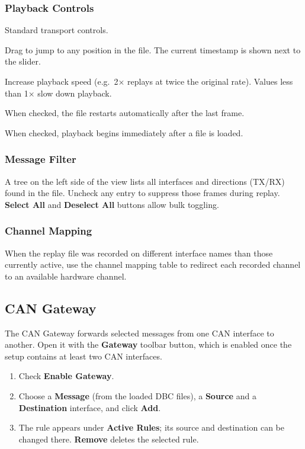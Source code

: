 \documentclass[a4paper,11pt]{article}
\newcommand{\ui}[1]{\textbf{#1}}
\begin{document}
\subsubsection{Playback Controls}

\begin{description}[leftmargin=2em, style=nextline]
  \item[Play / Pause / Stop] Standard transport controls.
  \item[Seek slider] Drag to jump to any position in the file. The current
        timestamp is shown next to the slider.
  \item[Speed multiplier] Increase playback speed (e.g.\ 2× replays at twice
        the original rate). Values less than 1× slow down playback.
  \item[Loop] When checked, the file restarts automatically after the last frame.
  \item[Auto-play] When checked, playback begins immediately after a file is loaded.
\end{description}

\subsubsection{Message Filter}

A tree on the left side of the view lists all interfaces and directions (TX/RX)
found in the file. Uncheck any entry to suppress those frames during replay.
\ui{Select All} and \ui{Deselect All} buttons allow bulk toggling.

\subsubsection{Channel Mapping}

When the replay file was recorded on different interface names than those currently
active, use the channel mapping table to redirect each recorded channel to an
available hardware channel.

\subsection{CAN Gateway}
\label{sec:gateway}

The CAN Gateway forwards selected messages from one CAN interface to another. Open
it with the \ui{Gateway} toolbar button, which is enabled once the setup contains
at least two CAN interfaces.

\begin{enumerate}
  \item Check \ui{Enable Gateway}.
  \item Choose a \ui{Message} (from the loaded DBC files), a \ui{Source} and a
        \ui{Destination} interface, and click \ui{Add}.
  \item The rule appears under \ui{Active Rules}; its source and destination can be
        changed there. \ui{Remove} deletes the selected rule.
\end{enumerate}
\end{document}
